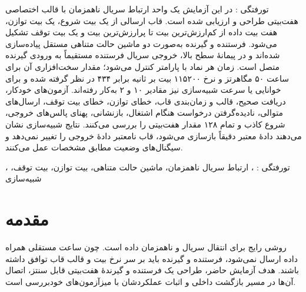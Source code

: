 \newsavebox{\dsdlcodebox}
\newenvironment{dsdlcodeblock}
{%
  \par\noindent
  \begin{latin}
  \begin{lrbox}{\dsdlcodebox}
  \begin{minipage}{0.94\linewidth}
  \small
}
{%
  \end{minipage}
  \end{lrbox}
  \setlength{\fboxsep}{6pt}
  \fcolorbox{dsdlcodeborder}{dsdlcodebg}{\usebox{\dsdlcodebox}}
  \end{latin}
  \par
}


‌تورفتگی : در این آزمایش یک واحد ارتباط سریال ناهمزمان
 با قالب اختصاصی هفت‌بیتی طراحی و ارزیابی شده است. قاب ارسالی از یک بیت
شروع، یک بیت توازن، هفت بیت داده از کم‌ارزش‌ترین بیت تا پرارزش‌ترین بیت و یک بیت توقف
تشکیل می‌شود. فرستنده و گیرنده به‌صورت دو ماشین حالت متناهی مستقل پیاده‌سازی شده‌اند و
در پیمانهٔ سطح بالا، خروجی سریال فرستنده مستقیماً به ورودی گیرنده متصل است. زمان هر نماد
با پارامتر  کنترل می‌شود؛ مقدار سخت‌افزاری آن برای ساعت ۵۰ مگاهرتز و
نرخ ۱۱۵۲۰۰ بیت بر ثانیه برابر ۴۳۴ در نظر گرفته شده و برای خوانایی یا سرعت شبیه‌سازی
نیز مقادیر ۱۰ و ۲ به‌کار رفته‌اند. آزمون‌های خودکار، دریافت صحیح، قالب و زمان‌بندی قاب،
خطای توازن، خطای بیت توقف، ارسال‌های متوالی، نادیده‌گرفتن درخواست هنگام اشتغال، بازنشانی،
پهنای پالس‌های خروجی، شروع کاذب و تمام ۱۲۸ مقدار هفت‌بیتی را بررسی می‌کنند. نتایج
شبیه‌سازی نشان می‌دهند دادهٔ معتبر دقیقاً بازسازی می‌شود، قاب نامعتبر دادهٔ خروجی را تغییر
نمی‌دهد و سیگنال‌های وضعیت مطابق مشخصات عمل می‌کنند.


‌تورفتگی :
، ارتباط سریال ناهمزمان، ماشین حالت متناهی، بیت توازن، بیت توقف،
، شبیه‌سازی


\section{مقدمه}

 روشی رایج برای انتقال سریال و ناهمزمان داده است. چون ساعت مستقلی همراه داده
ارسال نمی‌شود، فرستنده و گیرنده باید بر سر نرخ بیت و قالب قاب توافق داشته باشند. هدف
آزمایش حاضر، طراحی یک فرستنده و گیرندهٔ هفت‌بیتی قابل سنتز، اتصال آن‌ها در مسیر بازگشت
داخلی و اثبات عملکردشان با میزآزمون‌های خودبررسی است.

